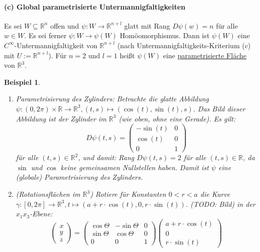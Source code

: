 \documentclass[a4paper,11pt,notitlepage]{report}
\newtheorem{example}{Beispiel}[chapter]
\newcommand{\R}{{\ensuremath{\mathbb{R}}}}
\begin{document}
\paragraph{(c) Global parametrisierte Untermannigfaltigkeiten}
Es sei $W \subseteq \R^n$ offen und $\psi \colon W \rightarrow \R^{n+l}$ glatt mit Rang $D\psi(w)=n$ für alle $w \in W$. Es sei ferner $\psi \colon W \rightarrow \psi(W)$ Homöomorphismus.
Dann ist $\psi(W)$ eine $C^\infty$-Untermannigfaltigkeit von $\R^{n+l}$ (nach Untermannigfaltigkeits-Kriterium (c) mit $U := \R^{n+l}$).
\newline
Für $n=2$ und $l=1$ heißt $\psi(W)$ eine \underline{parametrisierte Fläche} von $\R^3$.

\begin{example}
	\begin{enumerate}
		\item Parametrisierung des Zylinders:
			\newline
			Betrachte die glatte Abbildung $\psi \colon (0, 2 \pi) \times \R \rightarrow \R^3, (t,s) \mapsto (\cos{(t)}, \sin{(t)}, s)$. Das Bild dieser Abbildung ist der Zylinder im $\R^3$ (wie oben, ohne eine Gerade).
			Es gilt:
			$$D\psi(t,s) = \begin{pmatrix} -\sin{(t)} & 0 \\ \cos{(t)} & 0 \\ 0 & 1  \end{pmatrix} $$ für alle $(t,s) \in \R^2$, und damit:
			Rang $D \psi(t,s)=2$ für alle $(t,s) \in \R$, da $\sin$ und $\cos$ keine gemeinsamen Nullstellen haben.
			\newline
			Damit ist $\psi$ eine (globale) Parametrisierung des Zylinders.
			
		\item (Rotationsflächen im $\R^3$)
			\newline
			Rotiere für Konstanten $0 < r < a$ die Kurve $\gamma \colon [0,2\pi] \rightarrow \R^3, t \mapsto (a + r \cdot \cos{(t)}, 0, r \cdot \sin{(t)})$.
			(TODO: Bild) in der $x_1 x_3$-Ebene:
			$$\begin{pmatrix}
				x \\ y \\z
			\end{pmatrix} = \begin{pmatrix}
			\cos{\Theta} & -\sin{\Theta} & 0 \\ \sin{\Theta} & \cos{\Theta} & 0 \\ 0 & 0 & 1
\end{pmatrix} \begin{pmatrix}
	a + r \cdot \cos{(t)} \\ 0 \\ r \cdot \sin{(t)}
\end{pmatrix}$$


\end{enumerate}
\end{example}
\end{document}
